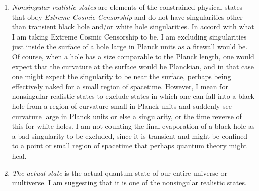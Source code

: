 \documentclass[12pt]{article}
\begin{document}
\begin{enumerate}
\item {\it Nonsingular realistic states} are elements of the constrained physical states that obey {\it Extreme Cosmic Censorship} and do not have singularities other than transient black hole and/or white hole singularities.  In accord with what I am taking Extreme Cosmic Censorship to be, I am excluding singularities just inside the surface of a hole large in Planck units as a firewall would be.  Of course, when a hole has a size comparable to the Planck length, one would expect that the curvature at the surface would be Planckian, and in that case one might expect the singularity to be near the surface, perhaps being effectively naked for a small region of spacetime.  However, I mean for nonsingular realistic states to exclude states in which one can fall into a black hole from a region of curvature small in Planck units and suddenly see curvature large in Planck units or else a singularity, or the time reverse of this for white holes.  I am not counting the final evaporation of a black hole as a bad singularity to be excluded, since it is transient and might be confined to a point or small region of spacetime that perhaps quantum theory might heal.

\item {\it The actual state} is the actual quantum state of our entire universe or multiverse.  I am suggesting that it is one of the nonsingular realistic states.

\end{enumerate}
\end{document}
